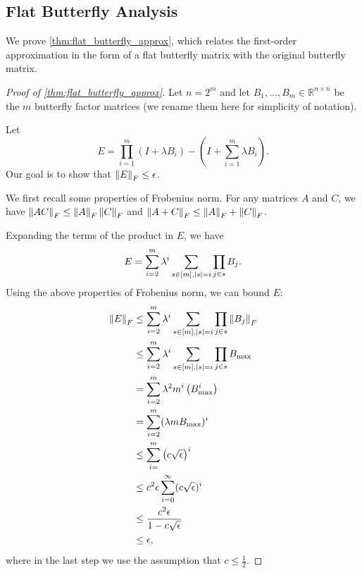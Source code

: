 \subsection{Flat Butterfly Analysis}
\label{subsec:flat_butterfly_proofs}

We prove \cref{thm:flat_butterfly_approx}, which relates the first-order
approximation in the form of a flat butterfly matrix with the original butterfly
matrix.
\begin{proof}[Proof of \cref{thm:flat_butterfly_approx}]
  Let $n = 2^m$ and let $B_1, \dots, B_m \in \mathbb{R}^{n \times n}$ be the $m$
  butterfly factor matrices (we rename them here for simplicity of notation).

  Let
  \begin{equation*}
    E = \prod_{i=1}^m \left(I + \lambda B_i\right) - \left( I + \sum_{i=1}^m \lambda B_i \right).
  \end{equation*}
  Our goal is to show that $\left\|{E}\right\|_F \leq \epsilon$.

  We first recall some properties of Frobenius norm.
  For any matrices $A$ and $C$, we have
  $\left\|{A C}\right\|_F \leq \left\|{A}\right\|_F \left\|{C}\right\|_F$ and
  $\left\|{A + C}\right\|_F \leq \left\|{A}\right\|_F + \left\|{C}\right\|_F$.

  Expanding the terms of the product in $E$, we have
  \begin{equation*}
    E = \sum_{i=2}^{m} \lambda^i \sum_{s \in [m], \left\lvert s\right\rvert = i} \prod_{j \in s} B_j.
  \end{equation*}
  Using the above properties of Frobenius norm, we can bound $E$:
  \begin{align*}
    \left\|{E}\right\|_F
    &\leq \sum_{i=2}^{m} \lambda^i \sum_{s \in [m], \left\lvert s\right\rvert = i} \prod_{j \in s} \left\|{B_j}\right\|_F \\
    &\leq \sum_{i=2}^{m} \lambda^i \sum_{s \in [m], \left\lvert s\right\rvert = i} \prod_{j \in s} B_\mathrm{max} \\
    &= \sum_{i=2}^{m} \lambda^2 m^i \left( B_\mathrm{max} ^i \right) \\
    &= \sum_{i=2}^{m} (\lambda m B_\mathrm{max})^i \\
    &\leq \sum_{i=}^{m} \left(c \sqrt{\epsilon} \right)^i \\
    &\leq c^2 \epsilon \sum_{i=0}^{\infty} (c \sqrt{\epsilon})^i \\
    &\leq \frac{c^2\epsilon}{1 - c\sqrt{\epsilon}} \\
    &\leq \epsilon,
  \end{align*}
  where in the last step we use the assumption that $c \leq \frac{1}{2}$.
\end{proof}

